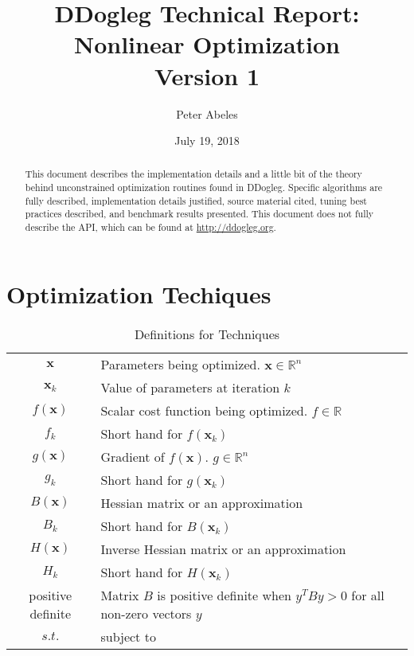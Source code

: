 \documentclass[peerreview,onecolumn]{IEEEtran}
\newcommand{\R}{\mathbb{R}}
\begin{document}
\title{DDogleg Technical Report: Nonlinear Optimization\\{\Large Version 1}}



\author{Peter Abeles}
\date{July 19, 2018}

\maketitle
\tableofcontents
\listoffigures
\listoftables

\IEEEpeerreviewmaketitle
\begin{abstract}
This document describes the implementation details and a little bit of the theory behind unconstrained optimization routines found in DDogleg. Specific algorithms are fully described, implementation details justified, source material cited, tuning best practices described, and benchmark results presented. This document does not fully describe the API, which can be found at \url{http://ddogleg.org}.
\end{abstract}


\section{Optimization Techiques}

\begin{table}[h]
\centering
\caption{\label{definitions:Techniques}Definitions for Techniques}
\begin{tabular}{cl}
$\bm{x}$ & Parameters being optimized. $\bm{x} \in \R^n$ \\
$\bm{x}_k$ & Value of parameters at iteration $k$ \\
$f(\bm{x})$ & Scalar cost function being optimized. $f \in \R$ \\
$f_k$ & Short hand for $f(\bm{x}_k)$ \\
$g(\bm{x})$ & Gradient of $f(\bm{x})$. $g \in \R^n$ \\
$g_k$ & Short hand for $g(\bm{x}_k)$ \\
$B(\bm{x})$ & Hessian matrix or an approximation \\ 
$B_k$ & Short hand for $B(\bm{x}_k)$ \\
$H(\bm{x})$ & Inverse Hessian matrix or an approximation \\ 
$H_k$ & Short hand for $H(\bm{x}_k)$ \\
positive definite & Matrix $B$ is positive definite when $y^T B y > 0$ for all non-zero vectors $y$  \\
$s.t.$ & subject to 
\end{tabular}
\end{table}
\end{document}

